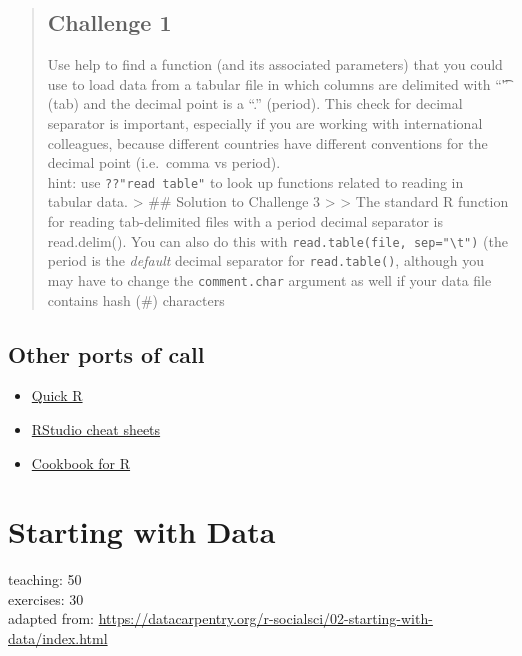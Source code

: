 \documentclass[]{book}
\providecommand{\tightlist}{%
  \setlength{\itemsep}{0pt}\setlength{\parskip}{0pt}}
\begin{document}
\begin{quote}
\section{Challenge 1}\label{challenge-1}

Use help to find a function (and its associated parameters) that you
could use to load data from a tabular file in which columns are
delimited with ``\t'' (tab) and the decimal point is a ``.'' (period).
This check for decimal separator is important, especially if you are
working with international colleagues, because different countries have
different conventions for the decimal point (i.e.~comma vs period).\\
hint: use \texttt{??"read\ table"} to look up functions related to
reading in tabular data. \textgreater{} \#\# Solution to Challenge 3
\textgreater{} \textgreater{} The standard R function for reading
tab-delimited files with a period decimal separator is read.delim(). You
can also do this with
\texttt{read.table(file,\ sep="\textbackslash{}t")} (the period is the
\emph{default} decimal separator for \texttt{read.table()}, although you
may have to change the \texttt{comment.char} argument as well if your
data file contains hash (\#) characters
\end{quote}

\section{Other ports of call}\label{other-ports-of-call}

\begin{itemize}
\tightlist
\item
  \href{http://www.statmethods.net/}{Quick R}
\item
  \href{http://www.rstudio.com/resources/cheatsheets/}{RStudio cheat
  sheets}
\item
  \href{http://www.cookbook-r.com/}{Cookbook for R}
\end{itemize}

\chapter{Starting with Data}\label{dataframes}

teaching: 50\\
exercises: 30\\
adapted from:
\url{https://datacarpentry.org/r-socialsci/02-starting-with-data/index.html}
\end{document}
